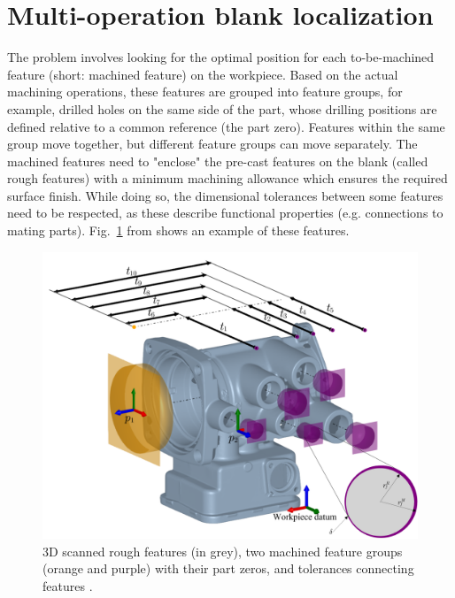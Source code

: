 \documentclass{juliacon}
\begin{document}
\section{Multi-operation blank localization}
\label{sec:algo}

The problem involves looking for the optimal position for each to-be-machined feature (short: machined feature) on the workpiece.
Based on the actual machining operations, these features are grouped into feature groups, for example, drilled holes on the same side of the part, whose drilling positions are defined relative to a common reference (the part zero).
Features within the same group move together, but different feature groups can move separately.
The machined features need to "enclose" the pre-cast features on the blank (called rough features) with a minimum machining allowance which ensures the required surface finish.
While doing so, the dimensional tolerances between some features need to be respected, as these describe functional properties (e.g. connections to mating parts).
Fig.~\ref{fig:hatfig} from \cite{cserteg:2023_Annals} shows an example of these features.

\begin{figure}[hbt]
	\centerline{\includegraphics[width=0.95\columnwidth]{cirp-annals-2023-figure-2.png}}
	\caption{3D scanned rough features (in grey), two machined feature groups (orange and purple) with their part zeros, and tolerances connecting features \cite{cserteg:2023_Annals}.}
	\label{fig:hatfig}
\end{figure}
\end{document}
